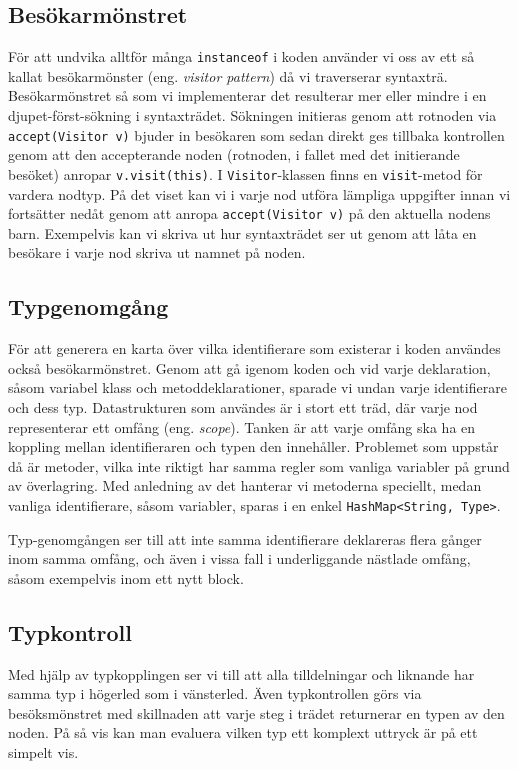 \documentclass[a4paper,11pt]{article}
\newcommand{\trans}[2][eng.]{(#1 \emph{#2})}
\renewcommand{\*}[0]{\cdot}
\begin{document}
\subsection*{Besökarmönstret}

För att undvika alltför många \texttt{instanceof} i koden använder vi oss av
ett så kallat besökarmönster \trans{visitor pattern} då vi traverserar
syntaxträ. Besökarmönstret så som vi implementerar det resulterar mer eller
mindre i en djupet-först-sökning i syntaxträdet. Sökningen initieras genom att
rotnoden via \texttt{accept(Visitor~v)} bjuder in besökaren som sedan direkt
ges tillbaka kontrollen genom att den accepterande noden (rotnoden, i fallet
med det initierande besöket) anropar \texttt{v.visit(this)}. I
\texttt{Visitor}-klassen finns en \texttt{visit}-metod för vardera nodtyp.  På
det viset kan vi i varje nod utföra lämpliga uppgifter innan vi fortsätter
nedåt genom att anropa \texttt{accept(Visitor~v)} på den aktuella nodens barn.
Exempelvis kan vi skriva ut hur syntaxträdet ser ut genom att låta en besökare
i varje nod skriva ut namnet på noden.

\subsection*{Typgenomgång}

För att generera en karta över vilka identifierare som existerar i koden
användes också besökarmönstret. Genom att gå igenom koden och vid varje
deklaration, såsom variabel klass och metoddeklarationer, sparade vi undan
varje identifierare och dess typ. Datastrukturen som användes är i stort ett
träd, där varje nod representerar ett omfång \trans{scope}. Tanken är att varje
omfång ska ha en koppling mellan identifieraren och typen den innehåller.
Problemet som uppstår då är metoder, vilka inte riktigt har samma regler som
vanliga variabler på grund av överlagring. Med anledning av det hanterar vi
metoderna speciellt, medan vanliga identifierare, såsom variabler, sparas i en
enkel \texttt{HashMap<String, Type>}.

Typ-genomgången ser till att inte samma identifierare deklareras flera gånger
inom samma omfång, och även i vissa fall i underliggande nästlade omfång, såsom
exempelvis inom ett nytt block.

\subsection*{Typkontroll}

Med hjälp av typkopplingen ser vi till att alla tilldelningar och liknande har
samma typ i högerled som i vänsterled. Även typkontrollen görs via
besöksmönstret med skillnaden att varje steg i trädet returnerar en typen av
den noden. På så vis kan man evaluera vilken typ ett komplext uttryck är på ett
simpelt vis.
\end{document}
